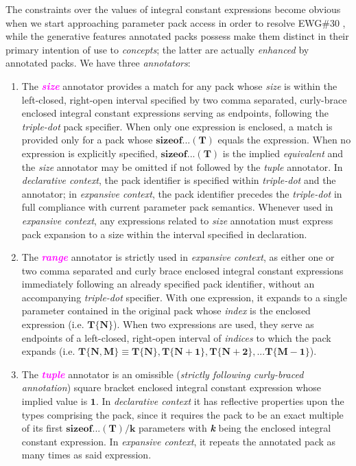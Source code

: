 \p The constraints over the values of integral constant expressions become obvious when we start approaching parameter pack access in order to resolve EWG\#30 \cite{Abrahams2012}, while the generative features annotated packs possess make them distinct in their primary intention of use to \textit{concepts}; the latter are actually \textit{enhanced} by annotated packs.
We have three \textit{annotators}:
\begin{enumerate}
\item\p The \textcolor{Magenta}{\textbf{\textit{size}}} annotator provides a match for any pack whose \textit{size} is within the left-closed, right-open interval specified by two comma separated, curly-brace enclosed integral constant expressions serving as endpoints, following the \textit{triple-dot} pack specifier.
When only one expression is enclosed, a match is provided only for a pack whose $\bm{sizeof...(T)}$ equals the expression.
When no expression is explicitly specified, $\bm{sizeof...(T)}$ is the implied \textit{equivalent} and the \textit{size} annotator may be omitted if not followed by the \textit{tuple} annotator.
In \textit{declarative context}, the pack identifier is specified within \textit{triple-dot} and the annotator; in \textit{expansive context}, the pack identifier precedes the \textit{triple-dot} in full compliance with current parameter pack semantics.
Whenever used in \textit{expansive context}, any expressions related to \textit{size} annotation must express pack expansion to a size within the interval specified in declaration.

\item\p The \textcolor{Magenta}{\textbf{\textit{range}}} annotator is strictly used in \textit{expansive context}, as either one or two comma separated and curly brace enclosed integral constant expressions immediately following an already specified pack identifier, without an accompanying \textit{triple-dot} specifier.
With one expression, it expands to a single parameter contained in the original pack whose \textit{index} is the enclosed expression (i.e. $\bm{T\{N\}}$).
When two expressions are used, they serve as endpoints of a left-closed, right-open interval of \textit{indices} to which the pack expands (i.e. $\bm{T\{N,M\} \equiv T\{N\},T\{N+1\},T\{N+2\},...T\{M-1\}}$).

\item\p The \textcolor{Magenta}{\textbf{\textit{tuple}}} annotator is an omissible (\textit{strictly following curly-braced annotation}) square bracket enclosed integral constant expression whose implied value is $\bm{1}$.
In \textit{declarative context} it has reflective properties upon the types comprising the pack, since it requires the pack to be an exact multiple of its first $\bm{sizeof...(T)/k}$ parameters  with \textbf{\textit{k}} being the enclosed integral constant expression.
In \textit{expansive context}, it repeats the annotated pack as many times as said expression.

\end{enumerate}


